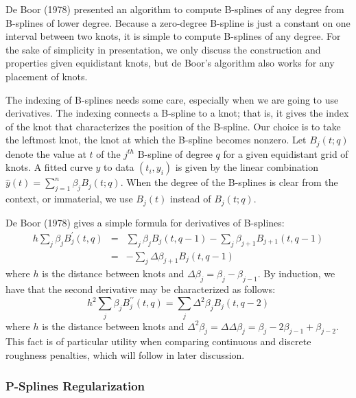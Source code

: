 \documentclass[12pt]{article}
\newcommand*\needsparaphrased{\color{red}}
\newcommand*\outlineskeleton{\color{green}}
\begin{document}
{\needsparaphrased De Boor (1978)} presented an algorithm to compute B-splines of any degree from B-splines of lower degree. Because a zero-degree B-spline is just a constant on one interval between two knots, it is simple to compute B-splines of any degree. For the sake of simplicity in presentation, we only discuss the construction and properties given equidistant knots, but de Boor's algorithm also works for any placement of knots.

The indexing of B-splines needs some care, especially when we are going to use derivatives. The indexing connects a B-spline to a knot; that is, it gives the index of the knot that characterizes the position of the B-spline. Our choice is to take the leftmost knot, the knot at which the B-spline becomes nonzero. Let $B_j\left(t; q\right)$ denote the value at $t$ of the $j^{th}$ B-spline of degree $q$ for a given equidistant grid of knots. A fitted curve $\hat{y}$ to data $\left(t_i,y_i\right)$ is given by the linear combination $\hat{y}\left(t\right) = \sum_{j=1}^n \beta_{j} B_j\left(t; q\right)$. When the degree of the B-splines is clear from the context, or immaterial, we use $B_j\left(t\right)$ instead of $B_j\left(t; q\right)$.

De Boor (1978) gives a simple formula for derivatives of B-splines:
\begin{eqnarray}
h\sum_{j} \beta_j B_j^\prime \left(t,q\right) &=& \sum_{j} \beta_j B_j\left(t,q-1\right)-\sum_{j} \beta_{j+1} B_{j+1} \left(t,q-1\right) \nonumber \\ 
&=& -\sum_{j} \Delta\beta_{j+1} B_{j} \left(t,q-1\right) \label{bspline_deriv}
\end{eqnarray}
\noindent
where $h$ is the distance between knots and $\Delta \beta_j = \beta_j-\beta_{j-1}$. By induction, we have that the second derivative may be characterized as follows:
\begin{equation}
h^2\sum_{j} \beta_j B_j^{\prime \prime} \left(t,q\right) = \sum_{j} \Delta^2 \beta_{j} B_{j} \left(t,q-2\right) \label{bspline_2nd_deriv}
\end{equation}
\noindent
where $h$ is the distance between knots and $\Delta^2 \beta_j = \Delta\Delta \beta_j = \beta_j - 2\beta_{j-1}+\beta_{j-2} $. This fact is of particular utility when comparing continuous and discrete roughness penalties, which will follow in later discussion.



\subsubsection{{\outlineskeleton P-Splines Regularization}}
\end{document}
